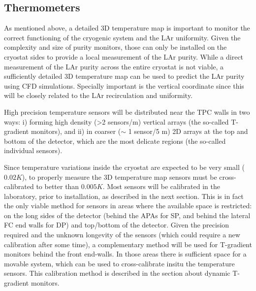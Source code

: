 \subsection{Thermometers}
\label{sec:fdgen-slow-cryo-therm}

As mentioned above, a detailed 3D temperature map is important to monitor the correct functioning of the cryogenic system and the LAr uniformity.
Given the complexity and size of purity monitors, those can only be installed on the cryostat sides to provide a local measurement of
the LAr purity. While a direct measurement of the LAr purity across the entire cryostat is not viable, a sufficiently detailed 3D temperature map
can be used to predict the LAr purity using CFD simulations. Specially important is the vertical coordinate since this will be closely related to
the LAr recirculation and uniformity. 

High precision temperature sensors will be distributed near the TPC walls in two ways:
i) forming high density (>2 sensors/m) vertical arrays (the so-called T-gradient monitors), and ii) in coarser ($\sim$ 1 sensor/5 m) 2D arrays 
at the top and bottom of the detector, which are the most delicate regions (the so-called individual sensors).   

Since temperature variations inside the cryostat are expected to be very small ($0.02 K$), to properly measure the 3D temperature map 
sensors must be cross-calibrated to better than $0.005 K$. Most sensors will be calibrated in the laboratory, prior to installation,
as described in the next section. This is in fact the only viable method for sensors in areas where the available space is restricted: on the long sides of the detector
(behind the APAs for SP, and behind the lateral FC end walls for DP) and top/bottom of the detector.
Given the precision required and the unknown longevity of the sensors (which could require a new calibration after some time), a complementary method
will be used for T-gradient monitors behind the front end-walls. In those areas there is sufficient space for a movable system, which can be used to cross-calibrate insitu
the temperature sensors. This calibration method is described in the section about dynamic T-gradient monitors. 

